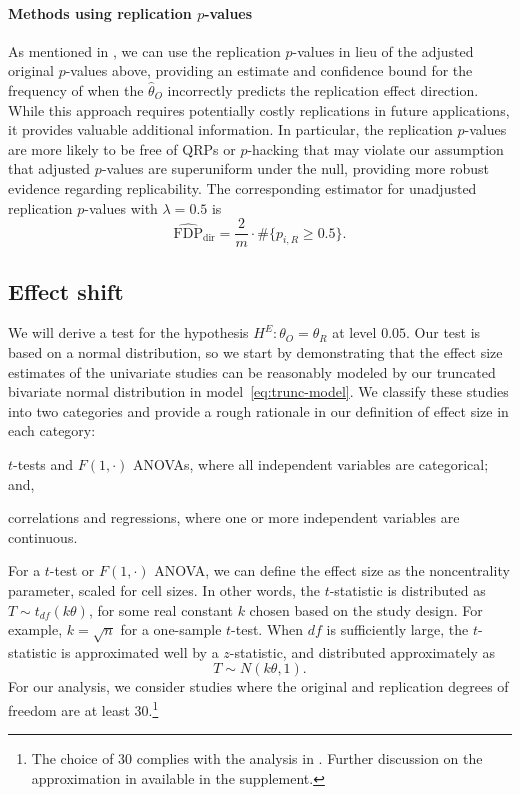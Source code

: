 \documentclass[aoas, preprint]{imsart}
\theoremstyle{definition}
\theoremstyle{custom}
\newcommand{\htheta}{\hat{\theta}}
\newcommand{\hFDPd}{\widehat{\text{FDP}}_\text{dir}}
\begin{document}
  \paragraph{Methods using replication $p$-values} As mentioned in , we can use the replication $p$-values in lieu of the adjusted original $p$-values above, providing an estimate and confidence bound for the frequency of when the $\htheta_O$ incorrectly predicts the replication effect direction. While this approach requires potentially costly replications in future applications, it provides valuable additional information. In particular, the replication $p$-values are more likely to be free of QRPs or $p$-hacking that may violate our assumption that adjusted $p$-values are superuniform under the null, providing more robust evidence regarding replicability. The corresponding estimator for unadjusted replication $p$-values with $\lambda= 0.5$ is 
  \[
    \hFDPd = \frac{2}{m} \cdot \#\{p_{i,R} \ge 0.5\}.
  \]

\subsection{Effect shift}

  We will derive a test for the hypothesis $H^E: \theta_O = \theta_R$ at level $0.05$. Our test is based on a normal distribution, so we start by demonstrating that the effect size estimates of the univariate studies can be reasonably modeled by our truncated bivariate normal distribution in model~\eqref{eq:trunc-model}. We classify these studies into two categories and provide a rough rationale in our definition of effect size in each category:
  \begin{inlinelist}
    \item $t$-tests and $F(1, \cdot)$ ANOVAs, where all independent variables are categorical; and,
    \item correlations and regressions, where one or more independent variables are continuous.
  \end{inlinelist}

  For a $t$-test or $F(1, \cdot)$ ANOVA, we can define the effect size as the noncentrality parameter, scaled for cell sizes. In other words, the $t$-statistic is distributed as $T \sim t_{df}(k\theta)$, for some real constant $k$ chosen based on the study design. For example, $k = \sqrt{n}$ for a one-sample $t$-test. When $df$ is sufficiently large, the $t$-statistic is approximated well by a $z$-statistic, and distributed approximately as
  \[
    T \sim N(k\theta, 1).
  \]
  For our analysis, we consider studies where the original and replication degrees of freedom are at least $30$.\footnote{The choice of $30$ complies with the analysis in \citet{Andrews:2018vh}. Further discussion on the approximation in available in the supplement.}
\end{document}
